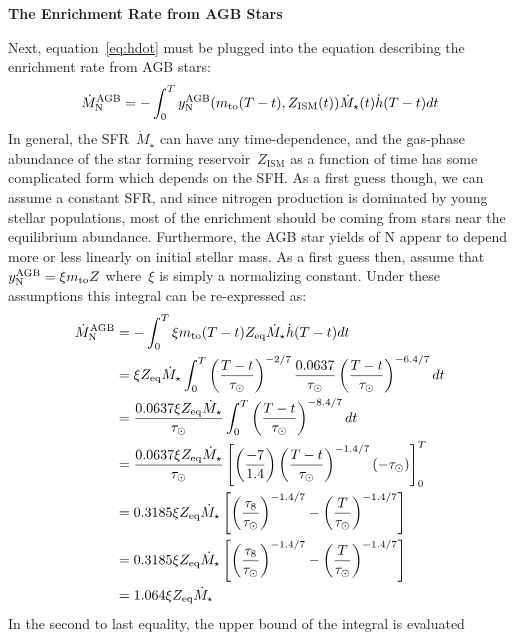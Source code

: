 \documentclass[\main/notes.tex]{subfiles}
\begin{document}
\twolineskip 
\textbf{The Enrichment Rate from AGB Stars} 
\par\noindent 
Next, equation~\ref{eq:hdot} must be plugged into the equation describing the 
enrichment rate from AGB stars: 
\begin{equation} 
\dot{M}_\text{N}^\text{AGB} = -\int_0^T y_\text{N}^\text{AGB}(m_\text{to}(T - t), 
Z_\text{ISM}(t)) \dot{M}_\star(t) \dot{h}(T - t) dt 
\end{equation} 
In general, the SFR~$\dot{M}_\star$ can have any time-dependence, and the 
gas-phase abundance of the star forming reservoir~$Z_\text{ISM}$ as a function 
of time has some complicated form which depends on the SFH. 
As a first guess though, we can assume a constant SFR, and since nitrogen 
production is dominated by young stellar populations, most of the enrichment 
should be coming from stars near the equilibrium abundance. 
Furthermore, the AGB star yields of N appear to depend more or less linearly on 
initial stellar mass. 
As a first guess then, assume that~$y_\text{N}^\text{AGB} = \xi m_\text{to} Z$ 
where~$\xi$ is simply a normalizing constant. 
Under these assumptions this integral can be re-expressed as: 
\begin{subequations}\begin{align} 
\dot{M}_\text{N}^\text{AGB} &= -\int_0^T \xi m_\text{to}(T - t) Z_\text{eq} 
\dot{M}_\star \dot{h}(T - t) dt 
\\ 
&= \xi Z_\text{eq} \dot{M}_\star \int_0^T 
\left(\frac{T - t}{\tau_\odot}\right)^{-2/7} \frac{0.0637}{\tau_\odot} 
\left(\frac{T - t}{\tau_\odot}\right)^{-6.4/7} dt 
\\ 
&= \frac{0.0637\xi Z_\text{eq}\dot{M}_\star}{\tau_\odot} 
\int_0^T \left(\frac{T - t}{\tau_\odot}\right)^{-8.4/7} dt 
\\ 
&= \frac{0.0637\xi Z_\text{eq}\dot{M}_\star}{\tau_\odot} 
\left[\left(\frac{-7}{1.4}\right)\left(\frac{T - t}{\tau_\odot}\right)^{-1.4/7}
(-\tau_\odot) 
\right]_0^T 
\\ 
&= 0.3185\xi Z_\text{eq}\dot{M}_\star
\left[\left(\frac{\tau_8}{\tau_\odot}\right)^{-1.4/7} - 
\left(\frac{T}{\tau_\odot}\right)^{-1.4/7}\right] 
\\ 
&= 0.3185\xi Z_\text{eq}\dot{M}_\star \left[
\left(\frac{\tau_8}{\tau_\odot}\right)^{-1.4/7} - 
\left(\frac{T}{\tau_\odot}\right)^{-1.4/7}\right] 
\\ 
&= 1.064 \xi Z_\text{eq} \dot{M}_\star 
\end{align}\end{subequations} 
In the second to last equality, the upper bound of the integral is evaluated 
\end{document}
